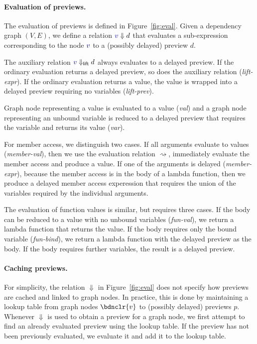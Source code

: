 \documentclass[sigplan,10pt,review,anonymous]{acmart}\settopmatter{printfolios=true,printccs=false,printacmref=false}
\theoremstyle{plain}
\theoremstyle{definition}
\newcommand{\ident}[1]{\textnormal{\sffamily #1}}
\newcommand{\bndclr}[1]{\textcolor{kvdclr}{#1}}
\begin{document}
\paragraph{Evaluation of previews.}
The evaluation of previews is defined in Figure~\ref{fig:eval}. Given a dependency graph $(V, E)$,
we define a relation $\bndclr{v}\Downarrow d$ that evaluates a sub-expression corresponding to 
the node $\bndclr{v}$ to a (possibly delayed) preview $d$. 

The auxiliary relation $\bndclr{v}\Downarrow_{\ident{lift}} d$ always evaluates
to a delayed preview. If the ordinary evaluation returns a delayed preview, so does the auxiliary
relation (\emph{lift-expr}). If the ordinary evaluation returns a value, the value is wrapped
into a delayed preview requiring no variables (\emph{lift-prev}).

Graph node representing a value is evaluated to a value (\emph{val}) and a graph node representing
an unbound variable is reduced to a delayed preview that requires the variable and returns its
value (\emph{var}).

For member access, we distinguish two cases. If all arguments evaluate to values (\emph{member-val}),
then we use the evaluation relation $\rightsquigarrow$, immediately evaluate the member access and 
produce a value. If one of the arguments is delayed (\emph{member-expr}), because the member access 
is in the body of a lambda function, then we produce a delayed member access experession that
requires the union of the variables required by the individual arguments.

The evaluation of function values is similar, but requires three cases. If the body can 
be reduced to a value with no unbound variables (\emph{fun-val}), we return a lambda function that
returns the value. If the body requires only the bound variable (\emph{fun-bind}), we return a 
lambda function with the delayed preview as the body. If the body requires further variables,
the result is a delayed preview.

\paragraph{Caching previews.}
For simplicity, the relation $\Downarrow$ in Figure~\ref{fig:eval} does not specify how previews 
are cached and linked to graph nodes. In practice, this is done by maintaining a lookup table
from graph nodes $\bdnclr{v}$ to (possibly delayed) previews $p$.
Whenever $\Downarrow$ is used to obtain a preview for a graph node, we first 
attempt to find an already evaluated preview using the lookup table. If the preview has not
been previously evaluated, we evaluate it and add it to the lookup table.
\end{document}
